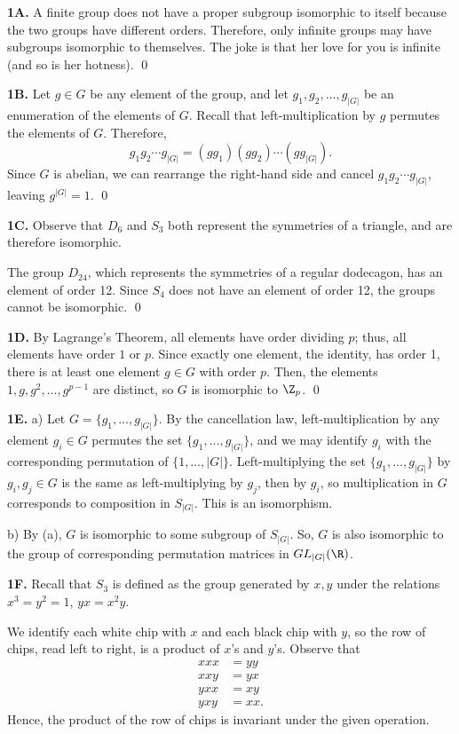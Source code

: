 \noindent\textbf{1A.}  A finite group does not have a proper subgroup isomorphic to itself because the two groups have different orders.  Therefore, only infinite groups may have subgroups isomorphic to themselves. The joke is that her love for you is infinite (and so is her hotness). \qed

\noindent\textbf{1B.}  Let $g\in G$ be any element of the group, and let $g_1,g_2,\dots,g_{|G|}$ be an enumeration of the elements of $G$.  Recall that left-multiplication by $g$ permutes the elements of $G$.  Therefore, 
\[g_1g_2\cdots g_{|G|}=(gg_1)(gg_2)\cdots (gg_{|G|}).\]
Since $G$ is abelian, we can rearrange the right-hand side and cancel $g_1g_2\cdots g_{|G|}$, leaving $g^{|G|}=1$.  \qed

\noindent\textbf{1C.}  Observe that $D_6$ and $S_3$ both represent the symmetries of a triangle, and are therefore isomorphic. 

The group $D_{24}$, which represents the symmetries of a regular dodecagon, has an element of order 12.  Since $S_4$ does not have an element of order 12, the groups cannot be isomorphic. \qed 

\noindent\textbf{1D.}  By Lagrange's Theorem, all elements have order dividing $p$; thus, all elements have order $1$ or $p$.  Since exactly one element, the identity, has order 1, there is at least one element $g\in G$ with order $p$.  Then, the elements $1,g,g^2,\dots,g^{p-1}$ are distinct, so $G$ is isomorphic to $\Z_p$.  \qed

\noindent\textbf{1E.}  a) Let $G=\{g_1, \dots, g_{|G|}\}$.  By the cancellation law, left-multiplication by any element $g_i\in G$ permutes the set $\{g_1,\dots,g_{|G|}\}$, and we may identify $g_i$ with the corresponding permutation of $\{1,\dots,|G|\}$.  Left-multiplying the set $\{g_1,\dots,g_{|G|}\}$ by $g_i,g_j\in G$ is the same as left-multiplying by $g_j$, then by $g_i$, so multiplication in $G$ corresponds to composition in $S_{|G|}$.  This is an isomorphism.  

b) By (a), $G$ is isomorphic to some subgroup of $S_{|G|}$.  So, $G$ is also isomorphic to the group of corresponding permutation matrices in $GL_{|G|}(\R)$.  

\noindent\textbf{1F.}  Recall that $S_3$ is defined as the group generated by $x,y$ under the relations $x^3=y^2=1$, $yx=x^2y$.  

We identify each white chip with $x$ and each black chip with $y$, so the row of chips, read left to right, is a product of $x$'s and $y$'s.  Observe that 
\begin{align*}
xxx&=yy\\
xxy&=yx\\
yxx&=xy\\
yxy&=xx.
\end{align*}
Hence, the product of the row of chips is invariant under the given operation.  

